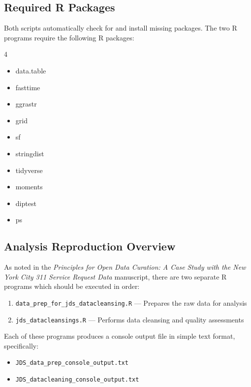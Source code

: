 \documentclass[linenumber]{jdsart}
\begin{document}
\subsection*{Required R Packages}


Both scripts automatically check for and install missing packages. The two R
programs require the following R packages:


\begin{multicols}{4}
\begin{itemize}
    \item data.table
    \item fasttime
    \item ggrastr
    \item grid
    \item sf
    \item stringdist
    \item tidyverse
    \item moments
    \item diptest
    \item ps
\end{itemize}
\end{multicols}


\subsection*{Analysis Reproduction Overview}


As noted in the \emph{Principles for Open Data Curation: A Case Study with the
New York City 311 Service Request Data} manuscript, there are two separate R 
programs which should be executed in order:


\begin{enumerate}[leftmargin=4em]
\item \texttt{data\_prep\_for\_jds\_datacleansing.R} --- Prepares the raw data for analysis

\item \texttt{jds\_datacleansings.R} --- Performs data cleansing and quality assessments
\end{enumerate}

Each of these programs produces a console output file in simple text format, specifically:


\begin{itemize}
\item \texttt{JDS\_data\_prep\_console\_output.txt}

\item \texttt{JDS\_datacleaning\_console\_output.txt}
\end{itemize}
\end{document}
